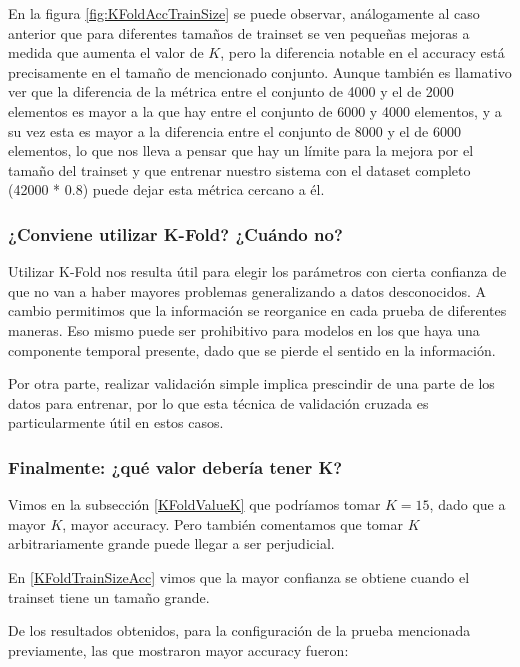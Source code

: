 En la figura \ref{fig:KFoldAccTrainSize} se puede observar, análogamente al caso anterior que para diferentes tamaños de trainset se ven pequeñas mejoras a medida que aumenta el valor de $K$, pero la diferencia notable en el accuracy está precisamente en el tamaño de mencionado conjunto. Aunque también es llamativo ver que la diferencia de la métrica entre el conjunto de 4000 y el de 2000 elementos es mayor a la que hay entre el conjunto de 6000 y 4000 elementos, y a su vez esta es mayor a la diferencia entre el conjunto de 8000 y el de 6000 elementos, lo que nos lleva a pensar que hay un límite para la mejora por el tamaño del trainset y que entrenar nuestro sistema con el dataset completo (42000 * 0.8) puede dejar esta métrica cercano a él.

\subsubsection{¿Conviene utilizar K-Fold? ¿Cuándo no?}

Utilizar K-Fold nos resulta útil para elegir los parámetros con cierta confianza de que no van a haber mayores problemas generalizando a datos desconocidos. A cambio permitimos que la información se reorganice en cada prueba de diferentes maneras. Eso mismo puede ser prohibitivo para modelos en los que haya una componente temporal presente, dado que se pierde el sentido en la información.

Por otra parte, realizar validación simple implica prescindir de una parte de los datos para entrenar, por lo que esta técnica de validación cruzada es particularmente útil en estos casos.

\subsubsection{Finalmente: ¿qué valor debería tener K?}

Vimos en la subsección \ref{KFoldValueK} que podríamos tomar $K=15$, dado que a mayor $K$, mayor accuracy. Pero también comentamos que tomar $K$ arbitrariamente grande puede llegar a ser perjudicial.

En \ref{KFoldTrainSizeAcc} vimos que la mayor confianza se obtiene cuando el trainset tiene un tamaño grande.

De los resultados obtenidos, para la configuración de la prueba mencionada previamente, las que mostraron mayor accuracy fueron:

